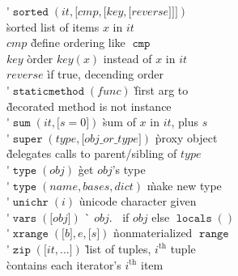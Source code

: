 \documentclass[landscape,10pt,letterpaper]{article}
\newcounter{pyversion}
\newcommand{\pyf}[1]{\ensuremath{\mathop{\mathtt{#1}}}}
\newcommand{\pyv}[2]{\ifthenelse{\value{pyversion}<#1}{}{#2}}
\newcommand{\pysec}[1]{\pyf{\_\_{#1}\_\_}}
\newcommand{\optional}[1]{{[}{#1}{]}}
\begin{document}
\begin{multicols}{6}
\begin{tabbing}
\'$\pyf{sorted}(it, \optional{cmp, \optional{key, \optional{reverse}}})$ \\ \` sorted list of items $x$ in $it$ \\
\> $cmp$ \` define ordering like \pyf{cmp} \\
\> $key$ \` order $key(x)$ instead of $x$ in $it$ \\
\> $reverse$ \` if true, decending order \\
\'$\pyf{staticmethod}(func)$ \` first arg to \\ \` decorated method is not instance \\
\'$\pyf{sum}(it, \optional{s=0})$ \` sum of $x$ in $it$, plus $s$ \\
\'$\pyf{super}(type, \optional{obj\_or\_type})$ \` proxy object \\ \` delegates calls to parent/sibling of $type$ \\
\'$\pyf{type}(obj)$ \` get $obj$'s type \\
\'$\pyf{type}(name, bases, dict)$ \` make new type \\
\'$\pyf{unichr}(i)$ \` unicode character given  \\
\'$\pyf{vars}(\optional{obj})$ \` $obj.\pysec{dict}$ if $obj$ else $\pyf{locals}()$ \\
\'$\pyf{xrange}(\optional{b}, e, \optional{s})$ \` nonmaterialized \pyf{range} \\
\'$\pyf{zip}(\optional{it, ...})$ \` list of tuples, $i^\mathrm{th}$ tuple \\ \` contains each iterator's $i^\mathrm{th}$ item
\end{tabbing}



\pyv{24}{}




\end{multicols}
\end{document}
